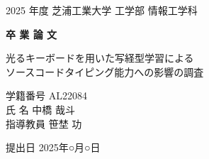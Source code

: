 \documentclass[uplatex, a4paper, 12pt]{jsarticle}
\begin{document}
\thispagestyle{empty} %

\begin{center}
\vspace*{2cm}

{\LARGE 2025 年度 芝浦工業大学 工学部 情報工学科}

\vspace{1.5cm}

{\Huge \textbf{卒 業 論 文}}

\vspace{2.5cm}

{\Large 光るキーボードを用いた写経型学習による\\[0.8em]
ソースコードタイピング能力への影響の調査}

\vspace{3cm}

{\Large
学籍番号  AL22084\\[1em]
氏    名  中橋 哉斗\\[1em]
指導教員  笹埜 功
}

\vfill

{\Large 提出日  2025年○月○日}

\end{center}

\newpage
\end{document}
